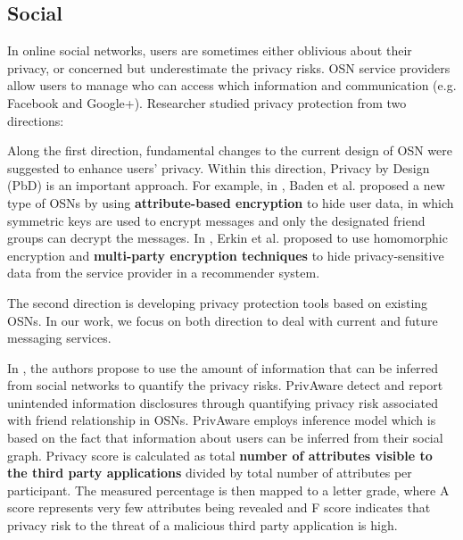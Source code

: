 \subsection{Social}



In online social networks,
	users are sometimes either oblivious about their privacy,
	or concerned but underestimate the privacy risks.
OSN service providers allow users to manage who can access which information and communication (e.g. Facebook and Google+).
Researcher studied privacy protection from two directions:

Along the first direction,
	fundamental changes to the current design of OSN were suggested to enhance users' privacy.
Within this direction, Privacy by Design (PbD) is an important approach.
For example,
	in \cite{baden_persona_2009}, Baden et al. proposed a new type of OSNs by using \textbf{attribute-based encryption} to hide user data,
	in which symmetric keys are used to encrypt messages and only the designated friend groups can decrypt the messages.
In \cite{erkin_generating_2011},
	Erkin et al. proposed to use homomorphic encryption and \textbf{multi-party encryption techniques} to hide privacy-sensitive data from the service provider in a recommender system.

The second direction is developing privacy protection tools based on existing OSNs.
In our work,
	we focus on both direction to deal with current and future messaging services.

In \cite{becker_measuring_2009},
	the authors propose to use the amount of information that can be inferred from social networks to quantify the privacy risks.
PrivAware detect and report unintended information disclosures through quantifying privacy risk associated with friend relationship in OSNs.
PrivAware employs inference model which is based on the fact that information about users can be inferred from their social graph.
Privacy score is calculated as total \textbf{number of attributes visible to the third party applications} divided by total number of attributes per participant.
The measured percentage is then mapped to a letter grade,
	where A score represents very few attributes being revealed and F score indicates that privacy risk to the threat of a malicious third party application is high.

